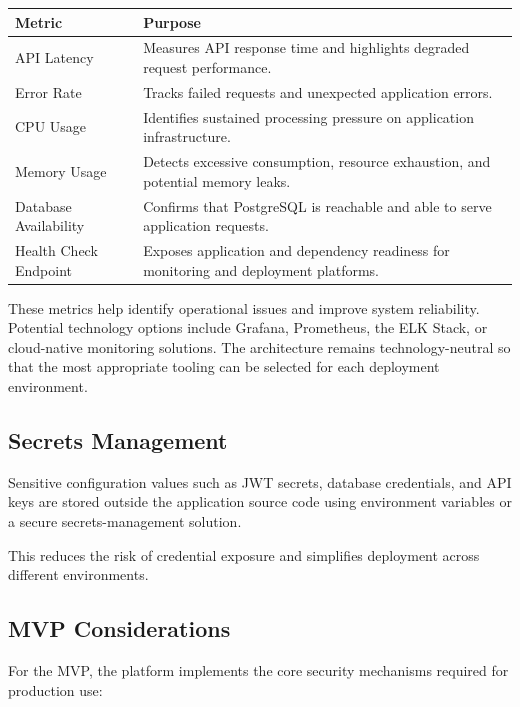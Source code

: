 \documentclass[11pt]{article}
\begin{document}
\renewcommand{\arraystretch}{1.15}
\begin{tabularx}{\textwidth}{|>{\raggedright\arraybackslash}p{}|>{\raggedright\arraybackslash}X|}
    \hline
    \textbf{Metric} & \textbf{Purpose} \\
    \hline
    API Latency & Measures API response time and highlights degraded request
    performance. \\
    \hline
    Error Rate & Tracks failed requests and unexpected application errors. \\
    \hline
    CPU Usage & Identifies sustained processing pressure on application
    infrastructure. \\
    \hline
    Memory Usage & Detects excessive consumption, resource exhaustion, and
    potential memory leaks. \\
    \hline
    Database Availability & Confirms that PostgreSQL is reachable and able to
    serve application requests. \\
    \hline
    Health Check Endpoint & Exposes application and dependency readiness for
    monitoring and deployment platforms. \\
    \hline
\end{tabularx}
\renewcommand{\arraystretch}{1}

These metrics help identify operational issues and improve system reliability.
Potential technology options include Grafana, Prometheus, the ELK Stack, or
cloud-native monitoring solutions. The architecture remains technology-neutral
so that the most appropriate tooling can be selected for each deployment
environment.

\subsection{Secrets Management}

Sensitive configuration values such as JWT secrets, database credentials, and
API keys are stored outside the application source code using environment
variables or a secure secrets-management solution.

This reduces the risk of credential exposure and simplifies deployment across
different environments.

\subsection{MVP Considerations}

For the MVP, the platform implements the core security mechanisms required for
production use:
\end{document}
